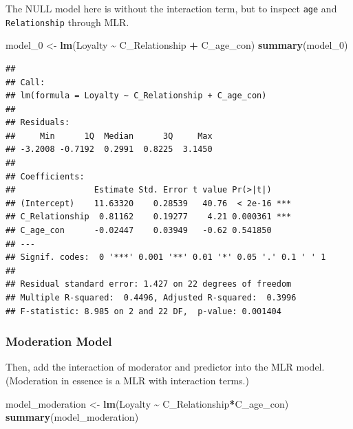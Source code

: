 \documentclass[
]{ctexart}
\newenvironment{Shaded}{\begin{snugshade}}{\end{snugshade}}
\newcommand{\FunctionTok}[1]{\textcolor[rgb]{0.13,0.29,0.53}{\textbf{#1}}}
\newcommand{\NormalTok}[1]{#1}
\newcommand{\OtherTok}[1]{\textcolor[rgb]{0.56,0.35,0.01}{#1}}
\newcommand{\SpecialCharTok}[1]{\textcolor[rgb]{0.81,0.36,0.00}{\textbf{#1}}}
\begin{document}
The NULL model here is without the interaction term, but to inspect
\texttt{age} and \texttt{Relationship} through MLR.

\begin{Shaded}
\begin{Highlighting}[]
\NormalTok{model\_0 }\OtherTok{\textless{}{-}} \FunctionTok{lm}\NormalTok{(Loyalty }\SpecialCharTok{\textasciitilde{}}\NormalTok{ C\_Relationship }\SpecialCharTok{+}\NormalTok{ C\_age\_con)}
\FunctionTok{summary}\NormalTok{(model\_0)}
\end{Highlighting}
\end{Shaded}

\begin{verbatim}
## 
## Call:
## lm(formula = Loyalty ~ C_Relationship + C_age_con)
## 
## Residuals:
##     Min      1Q  Median      3Q     Max 
## -3.2008 -0.7192  0.2991  0.8225  3.1450 
## 
## Coefficients:
##                Estimate Std. Error t value Pr(>|t|)    
## (Intercept)    11.63320    0.28539   40.76  < 2e-16 ***
## C_Relationship  0.81162    0.19277    4.21 0.000361 ***
## C_age_con      -0.02447    0.03949   -0.62 0.541850    
## ---
## Signif. codes:  0 '***' 0.001 '**' 0.01 '*' 0.05 '.' 0.1 ' ' 1
## 
## Residual standard error: 1.427 on 22 degrees of freedom
## Multiple R-squared:  0.4496, Adjusted R-squared:  0.3996 
## F-statistic: 8.985 on 2 and 22 DF,  p-value: 0.001404
\end{verbatim}

\hypertarget{moderation-model}{%
\subsubsection{Moderation Model}\label{moderation-model}}

Then, add the interaction of moderator and predictor into the MLR model.
(Moderation in essence is a MLR with interaction terms.)

\begin{Shaded}
\begin{Highlighting}[]
\NormalTok{model\_moderation }\OtherTok{\textless{}{-}} \FunctionTok{lm}\NormalTok{(Loyalty }\SpecialCharTok{\textasciitilde{}}\NormalTok{ C\_Relationship}\SpecialCharTok{*}\NormalTok{C\_age\_con)}
\FunctionTok{summary}\NormalTok{(model\_moderation)}
\end{Highlighting}
\end{Shaded}
\end{document}
